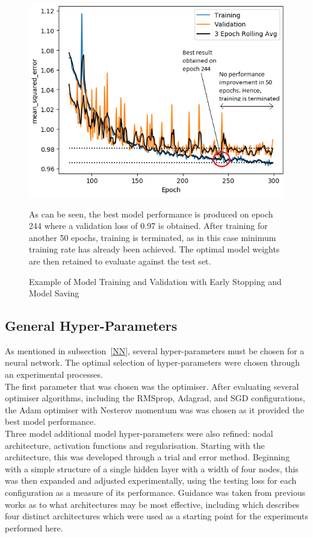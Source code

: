 \begin{figure}[h]
	\centering
	\includegraphics[scale=0.55]{Figures/Training History.png}
	\caption{Example of Model Training and Validation with Early Stopping and Model Saving} {As can be seen, the best model performance is produced on epoch 244 where a validation loss of 0.97 is obtained. After training for another 50 epochs, training is terminated, as in this case minimum training rate has already been achieved. The optimal model weights are then retained to evaluate against the test set.}
	\label{fig:train_history}
\end{figure}

\subsection{General Hyper-Parameters}

As mentioned in subsection~\ref{NN}, several hyper-parameters must be chosen for a neural network. The optimal selection of hyper-parameters were chosen through an experimental processes. 
\\

\noindent
The first parameter that was chosen was the optimiser. After evaluating several optimiser algorithms, including the RMSprop, Adagrad, and SGD configurations, the Adam optimiser with Nesterov momentum \cite{dozat2016incorporating} was was chosen as it provided the best model performance.
\\

\noindent
Three model additional model hyper-parameters were also refined: nodal architecture, activation functions and regularisation. Starting with the architecture, this was developed through a trial and error method. Beginning with a simple structure of a single hidden layer with a width of four nodes, this was then expanded and adjusted experimentally, using the testing loss for each configuration as a measure of its performance. Guidance was taken from previous works as to what architectures may be most effective, including \cite{fernandez2017nuclear} which describes four distinct architectures which were used as a starting point for the experiments performed here. 
\\

